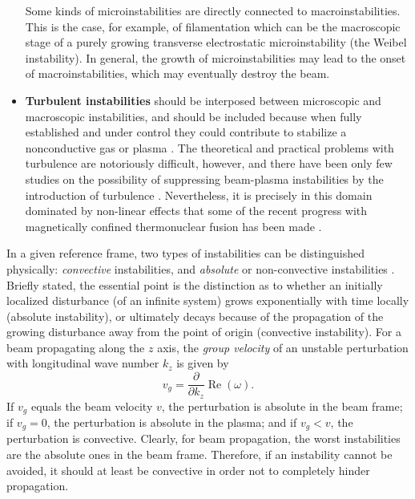 \documentclass [12pt,a4paper,     ]{report} %
\newcommand{\REA}{\operatorname{Re}}  %
\begin{document}
\begin{itemize}
Some kinds of microinstabilities are directly connected to macroinstabilities.  This is the case, for example, of filamentation which can be the macroscopic stage of a purely growing transverse electrostatic microinstability (the Weibel instability).  In general, the growth of microinstabilities may lead to the onset of macroinstabilities, which may eventually destroy the beam.

   \item {\bf Turbulent instabilities} should be interposed between microscopic and macroscopic instabilities, and should be included because when fully established and under control they could contribute to stabilize a nonconductive gas or plasma \cite{KOVAS1960-}.  The theoretical and practical problems with turbulence are notoriously difficult, however, and there have been only few studies on the possibility of suppressing beam-plasma instabilities by the introduction of turbulence \cite{HERSH1979-,FREUN1980-}.  Nevertheless, it is precisely in this domain dominated by non-linear effects that some of the recent progress with magnetically confined thermonuclear fusion has been made \cite{BURRE1998-}.

\end{itemize}

	In a given reference frame, two types of instabilities can be distinguished physically: \emph{convective} instabilities, and \emph{absolute} or non-convective instabilities \cite{BRIGG1971-}.  Briefly stated, the essential point is the distinction as to whether an initially localized disturbance (of an infinite system) grows exponentially with time locally (absolute instability), or ultimately decays because of the propagation of the growing disturbance away from the point of origin (convective instability).  For a beam propagating along the $z$ axis, the \emph{group velocity} of an unstable perturbation with longitudinal wave number $k_z$ is given by
%
\begin{equation}\label{sta:11} %
               v_g = \frac{\partial}{\partial k_z} \REA(\omega).
\end{equation}
%
If $v_g$ equals the beam velocity $v$, the perturbation is absolute in the beam frame; if  $v_g = 0$, the perturbation is absolute in the plasma; and if  $v_g < v$, the perturbation is convective.  Clearly, for beam propagation, the worst instabilities are the absolute ones in the beam frame.  Therefore, if an instability cannot be avoided, it should at least be convective in order not to completely hinder propagation.
\end{document}
